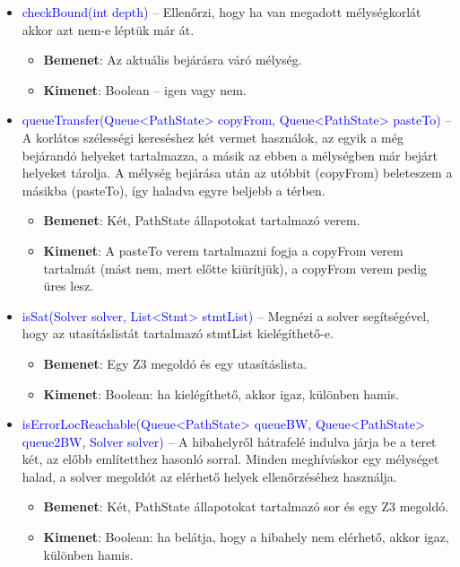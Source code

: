 \begin{itemize}
\begin{itemize}
	
		\item \textcolor{blue}{checkBound(int depth)} -- Ellenőrzi, hogy ha van megadott mélységkorlát akkor azt nem-e léptük már át.
		\begin{itemize}
			\item \textbf{Bemenet}: Az aktuális bejárásra váró mélység.
			\item \textbf{Kimenet}: Boolean -- igen vagy nem.
		\end{itemize}
	
		\item \textcolor{blue}{queueTransfer(Queue<PathState> copyFrom, Queue<PathState> pasteTo)} -- A korlátos szélességi kereséshez két vermet használok, az egyik a még bejárandó helyeket tartalmazza, a másik az ebben a mélységben már bejárt helyeket tárolja. A mélység bejárása után az utóbbit (copyFrom) beleteszem a másikba (pasteTo), így haladva egyre beljebb a térben.
		\begin{itemize}
			\item \textbf{Bemenet}: Két, PathState állapotokat tartalmazó verem.
			\item \textbf{Kimenet}: A pasteTo verem tartalmazni fogja a copyFrom verem tartalmát (mást nem, mert előtte kiürítjük), a copyFrom verem pedig üres lesz.
		\end{itemize}
	
		\item \textcolor{blue}{isSat(Solver solver, List<Stmt> stmtList)} -- Megnézi a solver segítségével, hogy az utasításlistát tartalmazó stmtList kielégíthető-e.
		\begin{itemize}
			\item \textbf{Bemenet}: Egy Z3 megoldó és egy utasításlista.
			\item \textbf{Kimenet}: Boolean: ha kielégíthető, akkor igaz, különben hamis.
		\end{itemize}
	
		\item \textcolor{blue}{isErrorLocReachable(Queue<PathState> queueBW, Queue<PathState> queue2BW, Solver solver)} -- A hibahelyről hátrafelé indulva járja be a teret két, az előbb említetthez hasonló sorral. Minden meghíváskor egy mélységet halad, a solver megoldót az elérhető helyek ellenőrzéséhez használja.
		\begin{itemize}
			\item \textbf{Bemenet}: Két, PathState állapotokat tartalmazó sor és egy Z3 megoldó.
			\item \textbf{Kimenet}: Boolean: ha belátja, hogy a hibahely nem elérhető, akkor igaz, különben hamis.
		\end{itemize}
	\end{itemize}


\end{itemize}
